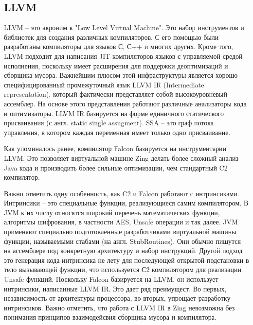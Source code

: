 \subsection{LLVM}
LLVM -- это акроним к "Low Level Virtual Machine". Это набор инструментов и библиотек для 
создания различных компиляторов. С его помощью были разработаны компиляторы для языков С, С++ и многих других. Кроме того, LLVM подходит для написания JIT-компиляторов языков с управляемой средой исполнения, поскольку имеет расширения для поддержки деоптимизаций и сборщика мусора. 
Важнейшим плюсом этой инфраструктуры является хорошо специфицированный промежуточный язык LLVM IR\cite{llvm-ref-man} (Intermediate representation), который фактически представляет собой высокоуровневый ассемблер. 
На основе этого представления работают различные анализаторы кода и оптимизаторы.
LLVM IR базируется на форме единичного статического присваивания (с англ. static single assugment). SSA -- это граф потока управления, в котором каждая переменная имеет только одно присваивание\cite{ssa-book}.
\par
Как упоминалось ранее, компилятор Falcon базируется на инструментарии LLVM. Это позволяет 
виртуальной машине Zing делать более сложный анализ Java кода и производить более сильные оптимизации, чем стандартный C2 компилятор\cite{falcon-gil}.
\par
Важно отметить одну особенность, как C2 и Falcon работают с интринсиками. 
Интринсики -- это специальные функции, реализующиеся самим компилятором. В JVM к их числу относятся широкий перечень математических функции, алгоритмы шифрования, в частности AES, Unsafe операции и так далее.
JVM применяют специально подготовленные разработчиками виртуальной машины функции, называемыми стабами (на англ. StubRoutines). Они обычно пишутся на ассемблере под конкретную
архитектуру и набор инструкций. Другой подход это генерация кода интринсика не лету для последующей открытой подстановки в тело вызывающей функции, что используется С2 компилятором для реализации Unsafe функций.
Поскольку Falcon базируется на LLVM, он использует интринсики, написанные LLVM IR. Это дает ряд преимущест. Во первых, независимость от архитектуры процессора, во вторых, упрощает разработку интринсиков.
Важно отметить, что работа с LLVM IR в Zing невозможна без понимания принципов взаимодейсвия сборщика мусора и компилятора.

